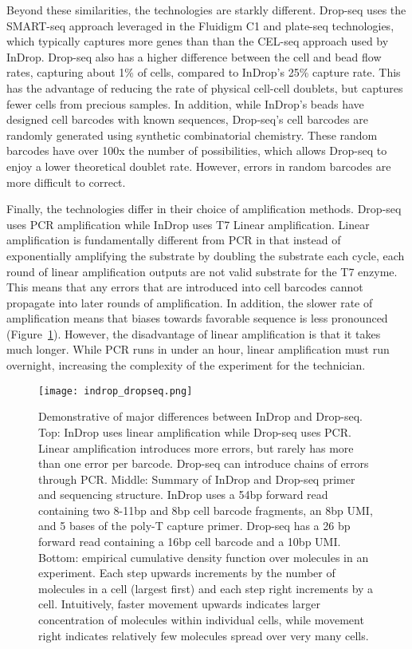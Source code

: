Beyond these similarities, the technologies are starkly different. 
Drop-seq uses the SMART-seq approach leveraged in the Fluidigm C1 and plate-seq technologies, which typically captures more genes than than the CEL-seq approach used by InDrop. %
Drop-seq also has a higher difference between the cell and bead flow rates, capturing about 1\% of cells, compared to InDrop’s 25\% capture rate. 
This has the advantage of reducing the rate of physical cell-cell doublets, but captures fewer cells from precious samples. 
In addition, while InDrop’s beads have designed cell barcodes with known sequences, Drop-seq’s cell barcodes are randomly generated using synthetic combinatorial chemistry. 
These random barcodes have over 100x the number of possibilities, which allows Drop-seq to enjoy a lower theoretical doublet rate. 
However, errors in random barcodes are more difficult to correct. 

Finally, the technologies differ in their choice of amplification methods. 
Drop-seq uses PCR amplification while InDrop uses T7 Linear amplification. 
Linear amplification is fundamentally different from PCR in that instead of exponentially amplifying the substrate by doubling the substrate each cycle, each round of linear amplification outputs are not valid substrate for the T7 enzyme. 
This means that any errors that are introduced into cell barcodes cannot propagate into later rounds of amplification. 
In addition, the slower rate of amplification means that biases towards favorable sequence is less pronounced (Figure~\ref{fig:indrop-dropseq}). 
However, the disadvantage of linear amplification is that it takes much longer. 
While PCR runs in under an hour, linear amplification must run overnight, increasing the complexity of the experiment for the technician. 

\begin{figure}
\centering
\texttt{[image: indrop\_dropseq.png]}
  \caption{Demonstrative of major differences between InDrop and Drop-seq. Top: InDrop uses linear amplification while Drop-seq uses PCR\@. Linear amplification introduces more errors, but rarely has more than one error per barcode. Drop-seq can introduce chains of errors through PCR\@. Middle: Summary of InDrop and Drop-seq primer and sequencing structure. InDrop uses a 54bp forward read containing two 8-11bp and 8bp cell barcode fragments, an 8bp UMI, and 5 bases of the poly-T capture primer. Drop-seq has a 26 bp forward read containing a 16bp cell barcode and a 10bp UMI\@. Bottom: empirical cumulative density function over molecules in an experiment. Each step upwards increments by the number of molecules in a cell (largest first) and each step right increments by a cell. Intuitively, faster movement upwards indicates larger concentration of molecules within individual cells, while movement right indicates relatively few molecules spread over very many cells.}
\label{fig:indrop-dropseq}
\end{figure} 

